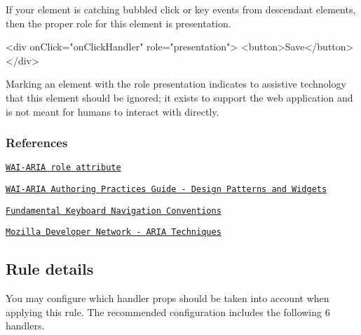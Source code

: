 If your element is catching bubbled click or key events from descendant elements, then the proper role for this element is {\ttfamily presentation}.


\begin{DoxyCode}
<div
  onClick="onClickHandler"
  role="presentation">
  <button>Save</button>
</div>
\end{DoxyCode}


Marking an element with the role {\ttfamily presentation} indicates to assistive technology that this element should be ignored; it exists to support the web application and is not meant for humans to interact with directly.

\subsubsection*{References}


\begin{DoxyEnumerate}
\item \href{https://www.w3.org/TR/wai-aria-1.1/#usage_intro}{\tt W\+A\+I-\/\+A\+R\+IA {\ttfamily role} attribute}
\end{DoxyEnumerate}
\begin{DoxyEnumerate}
\item \href{https://www.w3.org/TR/wai-aria-practices-1.1/#aria_ex}{\tt W\+A\+I-\/\+A\+R\+IA Authoring Practices Guide -\/ Design Patterns and Widgets}
\end{DoxyEnumerate}
\begin{DoxyEnumerate}
\item \href{https://www.w3.org/TR/wai-aria-practices-1.1/#kbd_generalnav}{\tt Fundamental Keyboard Navigation Conventions}
\end{DoxyEnumerate}
\begin{DoxyEnumerate}
\item \href{https://developer.mozilla.org/en-US/docs/Web/Accessibility/ARIA/ARIA_Techniques/Using_the_button_role#Keyboard_and_focus}{\tt Mozilla Developer Network -\/ A\+R\+IA Techniques}
\end{DoxyEnumerate}

\subsection*{Rule details}

You may configure which handler props should be taken into account when applying this rule. The recommended configuration includes the following 6 handlers.


